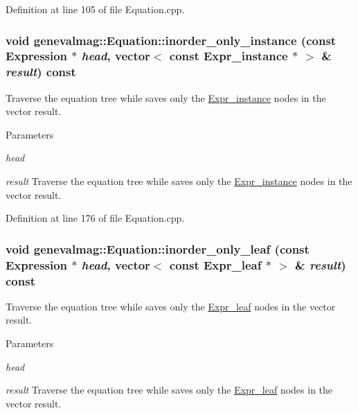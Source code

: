 Definition at line 105 of file Equation.cpp.

\hypertarget{classgenevalmag_1_1Equation_a34b874554d9ed47d37473ae4dab5d16e}{
\subsubsection[{inorder\_\-only\_\-instance}]{\setlength{\rightskip}{0pt plus 5cm}void genevalmag::Equation::inorder\_\-only\_\-instance (const {\bf Expression} $\ast$ {\em head}, \/  vector$<$ const {\bf Expr\_\-instance} $\ast$ $>$ \& {\em result}) const}}
\label{classgenevalmag_1_1Equation_a34b874554d9ed47d37473ae4dab5d16e}
Traverse the equation tree while saves only the \hyperlink{classgenevalmag_1_1Expr__instance}{Expr\_\-instance} nodes in the vector result. 
\begin{DoxyParams}{Parameters}
\item[{\em head}]\item[{\em result}]Traverse the equation tree while saves only the \hyperlink{classgenevalmag_1_1Expr__instance}{Expr\_\-instance} nodes in the vector result. \end{DoxyParams}


Definition at line 176 of file Equation.cpp.

\hypertarget{classgenevalmag_1_1Equation_abcc00948998a3828cd1f107afda796b1}{
\subsubsection[{inorder\_\-only\_\-leaf}]{\setlength{\rightskip}{0pt plus 5cm}void genevalmag::Equation::inorder\_\-only\_\-leaf (const {\bf Expression} $\ast$ {\em head}, \/  vector$<$ const {\bf Expr\_\-leaf} $\ast$ $>$ \& {\em result}) const}}
\label{classgenevalmag_1_1Equation_abcc00948998a3828cd1f107afda796b1}
Traverse the equation tree while saves only the \hyperlink{classgenevalmag_1_1Expr__leaf}{Expr\_\-leaf} nodes in the vector result. 
\begin{DoxyParams}{Parameters}
\item[{\em head}]\item[{\em result}]Traverse the equation tree while saves only the \hyperlink{classgenevalmag_1_1Expr__leaf}{Expr\_\-leaf} nodes in the vector result. \end{DoxyParams}



